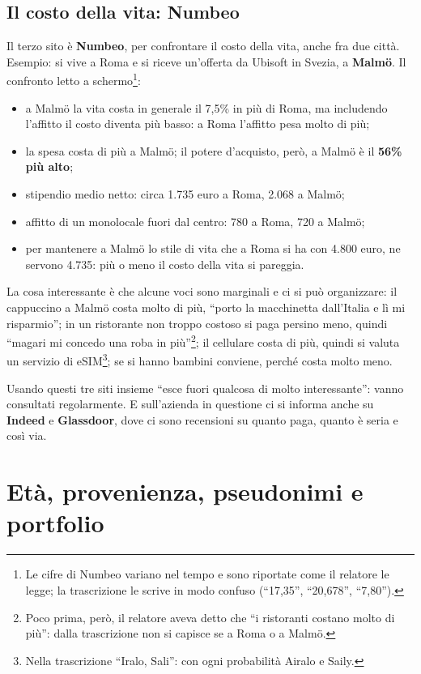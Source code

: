 \subsection{Il costo della vita: Numbeo}

Il terzo sito è \textbf{Numbeo}, per confrontare il costo della vita, anche
fra due città. Esempio: si vive a Roma e si riceve un'offerta da Ubisoft in
Svezia, a \textbf{Malmö}. Il confronto letto a schermo\footnote{Le cifre di
Numbeo variano nel tempo e sono riportate come il relatore le legge; la
trascrizione le scrive in modo confuso (``17,35'', ``20,678'', ``7,80'').}:
\begin{itemize}
  \item a Malmö la vita costa in generale il 7,5\% in più di Roma, ma
        includendo l'affitto il costo diventa più basso: a Roma l'affitto
        pesa molto di più;
  \item la spesa costa di più a Malmö; il potere d'acquisto, però, a Malmö è
        il \textbf{56\% più alto};
  \item stipendio medio netto: circa 1.735 euro a Roma, 2.068 a Malmö;
  \item affitto di un monolocale fuori dal centro: 780 a Roma, 720 a Malmö;
  \item per mantenere a Malmö lo stile di vita che a Roma si ha con 4.800
        euro, ne servono 4.735: più o meno il costo della vita si pareggia.
\end{itemize}
La cosa interessante è che alcune voci sono marginali e ci si può
organizzare: il cappuccino a Malmö costa molto di più, ``porto la macchinetta
dall'Italia e lì mi risparmio''; in un ristorante non troppo costoso si paga
persino meno, quindi ``magari mi concedo una roba in più''\footnote{Poco
prima, però, il relatore aveva detto che ``i ristoranti costano molto di
più'': dalla trascrizione non si capisce se a Roma o a Malmö.}; il cellulare
costa di più, quindi si valuta un servizio di eSIM\footnote{Nella trascrizione
``Iralo, Sali'': con ogni probabilità Airalo e Saily.}; se si hanno bambini
conviene, perché costa molto meno.

Usando questi tre siti insieme ``esce fuori qualcosa di molto interessante'':
vanno consultati regolarmente. E sull'azienda in questione ci si informa
anche su \textbf{Indeed} e \textbf{Glassdoor}, dove ci sono recensioni su
quanto paga, quanto è seria e così via.

\section{Età, provenienza, pseudonimi e portfolio}
\label{p4:sec:eta}

